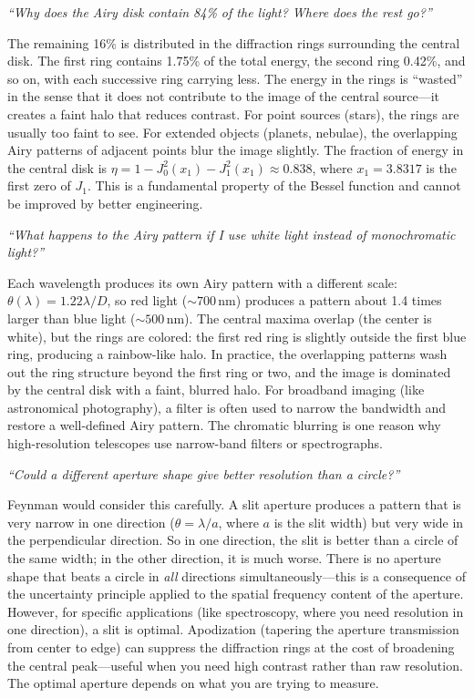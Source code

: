 \textit{``Why does the Airy disk contain 84\% of the light? Where does the rest go?''}

The remaining 16\% is distributed in the diffraction rings surrounding the central disk. The first ring contains 1.75\% of the total energy, the second ring 0.42\%, and so on, with each successive ring carrying less. The energy in the rings is ``wasted'' in the sense that it does not contribute to the image of the central source---it creates a faint halo that reduces contrast. For point sources (stars), the rings are usually too faint to see. For extended objects (planets, nebulae), the overlapping Airy patterns of adjacent points blur the image slightly. The fraction of energy in the central disk is $\eta = 1 - J_0^2(x_1) - J_1^2(x_1) \approx 0.838$, where $x_1 = 3.8317$ is the first zero of $J_1$. This is a fundamental property of the Bessel function and cannot be improved by better engineering.

\textit{``What happens to the Airy pattern if I use white light instead of monochromatic light?''}

Each wavelength produces its own Airy pattern with a different scale: $\theta(\lambda) = 1.22\lambda/D$, so red light ($\sim 700\,\text{nm}$) produces a pattern about 1.4 times larger than blue light ($\sim 500\,\text{nm}$). The central maxima overlap (the center is white), but the rings are colored: the first red ring is slightly outside the first blue ring, producing a rainbow-like halo. In practice, the overlapping patterns wash out the ring structure beyond the first ring or two, and the image is dominated by the central disk with a faint, blurred halo. For broadband imaging (like astronomical photography), a filter is often used to narrow the bandwidth and restore a well-defined Airy pattern. The chromatic blurring is one reason why high-resolution telescopes use narrow-band filters or spectrographs.

\textit{``Could a different aperture shape give better resolution than a circle?''}

Feynman would consider this carefully. A slit aperture produces a pattern that is very narrow in one direction ($\theta = \lambda/a$, where $a$ is the slit width) but very wide in the perpendicular direction. So in one direction, the slit is better than a circle of the same width; in the other direction, it is much worse. There is no aperture shape that beats a circle in \emph{all} directions simultaneously---this is a consequence of the uncertainty principle applied to the spatial frequency content of the aperture. However, for specific applications (like spectroscopy, where you need resolution in one direction), a slit is optimal. Apodization (tapering the aperture transmission from center to edge) can suppress the diffraction rings at the cost of broadening the central peak---useful when you need high contrast rather than raw resolution. The optimal aperture depends on what you are trying to measure.

